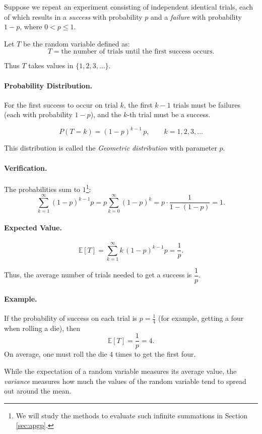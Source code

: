 \begin{example}
Suppose we repeat an experiment consisting of independent identical trials,
each of which results in a \emph{success} with probability $p$ and a
\emph{failure} with probability $1-p$, where $0<p\le 1$.

Let $T$ be the random variable defined as:
\[
T = \text{the number of trials until the first success occurs}.
\]

Thus $T$ takes values in $\{1,2,3,\dots\}$.

\paragraph{Probability Distribution.}
For the first success to occur on trial $k$, the first $k-1$ trials must be
failures (each with probability $1-p$), and the $k$-th trial must be a success.

\[
P(T = k) = (1-p)^{k-1} \, p, \qquad k=1,2,3,\dots
\]

This distribution is called the \emph{Geometric distribution} with parameter $p$.

\paragraph{Verification.}
The probabilities sum to $1$\footnote{We will study the methods to evaluate such infinite summations in Section \ref{sec:apgp}.}:
\[
\sum_{k=1}^{\infty} (1-p)^{k-1} p 
= p \sum_{k=0}^{\infty} (1-p)^k
= p \cdot \frac{1}{1-(1-p)}
= 1.
\]

\paragraph{Expected Value.}
\[
\mathbb{E}[T]
= \sum_{k=1}^{\infty} k \, (1-p)^{k-1} p
= \frac{1}{p}.
\]

Thus, the average number of trials needed to get a success is $\dfrac{1}{p}$.

\paragraph{Example.}
If the probability of success on each trial is $p=\tfrac{1}{4}$ (for example,
getting a four when rolling a die), then
\[
\mathbb{E}[T] = \frac{1}{p} = 4.
\]
On average, one must roll the die $4$ times to get the first four.
\end{example}

While the expectation of a random variable measures its average value,
the \emph{variance} measures how much the values of the random variable
tend to spread out around the mean.


